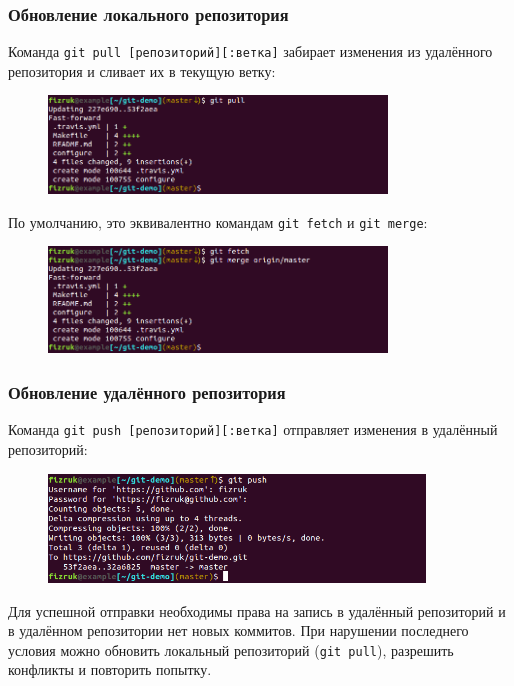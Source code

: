 \documentclass{beamer}
\begin{document}
\begin{frame}
  \frametitle{Обновление локального репозитория}
  Команда \texttt{git pull [репозиторий][:ветка]} забирает изменения из 
  удалённого репозитория и сливает их в текущую ветку:

  \begin{figure}
    \includegraphics[width=9cm]{images/git-pull.png}
  \end{figure}

  По умолчанию, это эквивалентно командам \texttt{git fetch} и \texttt{git merge}:

  \begin{figure}
    \includegraphics[width=9cm]{images/git-fetch-merge.png}
  \end{figure}
\end{frame}

\begin{frame}
  \frametitle{Обновление удалённого репозитория}
  Команда \texttt{git push [репозиторий][:ветка]} отправляет
  изменения в удалённый репозиторий:

  \begin{figure}
    \includegraphics[width=10cm]{images/git-push.png}
  \end{figure}

  Для успешной отправки необходимы права на запись в удалённый репозиторий и в удалённом
  репозитории нет новых коммитов. При нарушении последнего условия можно обновить локальный
  репозиторий (\texttt{git pull}), разрешить конфликты и повторить попытку.
\end{frame}
\end{document}
